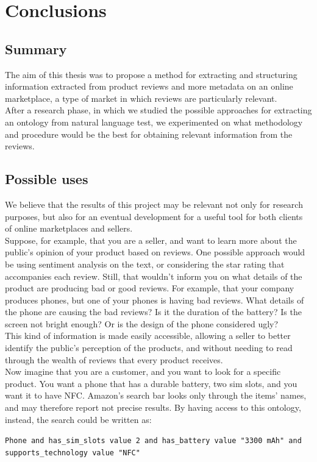 \documentclass[LaM,oneside,binding=0.6cm]{sapthesis}
\begin{document}
\chapter{Conclusions}

\section{Summary}

The aim of this thesis was to propose a method for extracting and structuring information extracted from product reviews and more metadata on an online marketplace, a type of market in which reviews are particularly relevant. \\

After a research phase, in which we studied the possible approaches for extracting an ontology from natural language test, we experimented on what methodology and procedure would be the best for obtaining relevant information from the reviews.

\section{Possible uses}

We believe that the results of this project may be relevant not only for research purposes, but also for an eventual development for a useful tool for both clients of online marketplaces and sellers. \\

Suppose, for example, that you are a seller, and want to learn more about the public's opinion of your product based on reviews. One possible approach would be using sentiment analysis on the text, or considering the star rating that accompanies each review. Still, that wouldn't inform you on what details of the product are producing bad or good reviews. For example, that your company produces phones, but one of your phones is having bad reviews. What details of the phone are causing the bad reviews? Is it the duration of the battery? Is the screen not bright enough? Or is the design of the phone considered ugly? \\

This kind of information is made easily accessible, allowing a seller to better identify the public's perception of the products, and without needing to read through the wealth of reviews that every product receives. \\

Now imagine that you are a customer, and you want to look for a specific product. You want a phone that has a durable battery, two sim slots, and you want it to have NFC. Amazon's search bar looks only through the items' names, and may therefore report not precise results. By having access to this ontology, instead, the search could be written as:
\begin{center}
\texttt{Phone and has\_sim\_slots value 2 and has\_battery value "3300 mAh" and supports\_technology value "NFC"}
\end{center}
\end{document}

